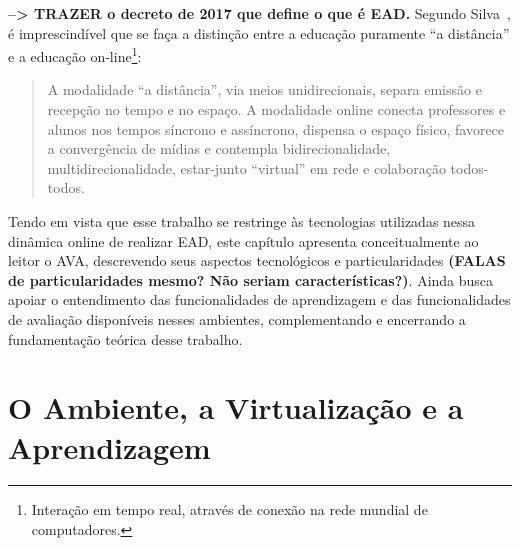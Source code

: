 \newcommand{\texCommand}[1]{\texttt{\textbackslash{#1}}}%

\newcommand{\exemplo}[1]{%
\vspace{\baselineskip}%
\noindent\fbox{\begin{minipage}{\textwidth}#1\end{minipage}}%
\\\vspace{\baselineskip}}%

\newcommand{\exemploVerbatim}[1]{%
\vspace{\baselineskip}%
\noindent\fbox{\begin{minipage}{\textwidth}%
#1\end{minipage}}%
\\\vspace{\baselineskip}}%


\label{chap:ava}
\textbf{--> TRAZER o decreto de 2017 que define o que é EAD.}
Segundo Silva~\cite{silva2003educacao}, é imprescindível que se faça a distinção entre a educação puramente ``a distância'' e a educação on-line\footnote{Interação em tempo real, através de conexão na rede mundial de computadores.}: 

\begin{quote}
A modalidade “a distância”, via meios unidirecionais, separa emissão e recepção no tempo e no espaço. A modalidade online conecta professores e alunos nos tempos síncrono e assíncrono, dispensa o espaço físico, favorece a convergência de mídias e contempla bidirecionalidade, multidirecionalidade, estar-junto “virtual” em rede e colaboração todos-todos.
\end{quote}

Tendo em vista que esse trabalho se restringe às tecnologias utilizadas nessa dinâmica online de realizar EAD, este capítulo apresenta conceitualmente ao leitor o  \acrfull{AVA}, descrevendo seus aspectos tecnológicos e particularidades\textbf{ (FALAS de particularidades mesmo? Não seriam características?)}. Ainda busca apoiar o entendimento das funcionalidades de aprendizagem e das funcionalidades de avaliação disponíveis nesses ambientes, complementando e encerrando a fundamentação teórica desse trabalho. 
\section{O Ambiente, a Virtualização e a Aprendizagem}%

